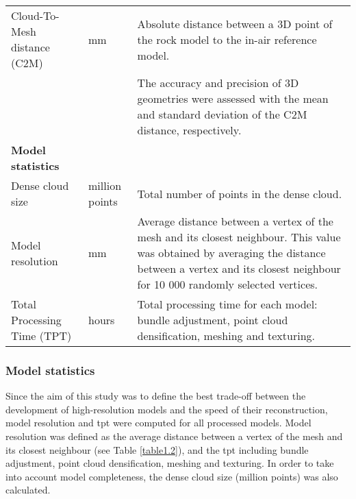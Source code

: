 \begin{table}[H]
{\begin{tabular}{L{4cm} L{1cm}L{10cm}}
Cloud-To-Mesh distance (C2M)                           & mm             & Absolute distance between a 3D point of the rock model to the in-air reference model.                                                                                                                                                                                                       \\
                                                       &                & The accuracy and precision of 3D geometries were assessed with the mean and standard deviation of the C2M distance, respectively.                                                                                                                                                           \\
\textbf{Model statistics}                              &                &                                                                                                                                                                                                                                                                                             \\
Dense cloud size                                       & million points & Total number of points in the dense cloud.                                                                                                                                                                                                                                                  \\
Model resolution                                       & mm             & Average distance between a vertex of the mesh and its closest neighbour. This value was obtained by averaging the distance between a vertex and its closest neighbour for 10 000 randomly selected vertices.                                                                                \\
Total Processing Time (TPT)                            & hours          & Total processing time for each model: bundle adjustment, point cloud densification, meshing and texturing.\\                                                       \bottomrule
\end{tabular}
    }
\end{table}

\subsubsection{Model statistics}\label{chapitre1_2.3.2}
Since the aim of this study was to define the best trade-off between the development of high-resolution models and the speed of their reconstruction, model resolution and \gls{tpt} were computed for all processed models. Model resolution was defined as the average distance between a vertex of the mesh and its closest neighbour (see Table \ref{table1.2}), and the \acrshort{tpt} including bundle adjustment, point cloud densification, meshing and texturing. In order to take into account model completeness, the dense cloud size (million points) was also calculated.

